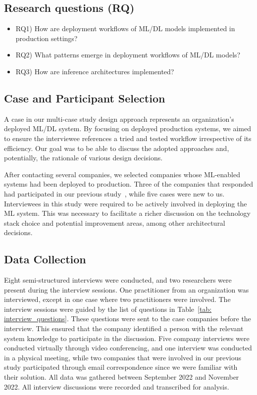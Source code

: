 \subsection{Research questions (RQ)}
\begin{itemize}
    \item RQ1) How are deployment workflows of ML/DL models implemented in production settings?
    \item RQ2) What patterns emerge in deployment workflows of ML/DL models?
    \item RQ3) How are inference architectures implemented?
\end{itemize}

\subsection{Case and Participant Selection}
A case in our multi-case study design approach represents an organization's deployed ML/DL system. By focusing on deployed production systems, we aimed to ensure the interviewee references a tried and tested workflow irrespective of its efficiency. Our goal was to be able to discuss the adopted approaches and, potentially, the rationale of various design decisions.

After contacting several companies, we selected companies whose ML-enabled systems had been deployed to production. Three of the companies that responded had participated in our previous study~\cite{muiruri2022practices}, while five cases were new to us. Interviewees in this study were required to be actively involved in deploying the ML system. This was necessary to facilitate a richer discussion on the technology stack choice and potential improvement areas, among other architectural decisions.


\subsection{Data Collection}
Eight semi-structured interviews were conducted, and two researchers were present during the interview sessions. One practitioner from an organization was interviewed, except in one case where two practitioners were involved. The interview sessions were guided by the list of questions in Table~\ref{tab: interview_questions}. These questions were sent to the case companies before the interview. This ensured that the company identified a person with the relevant system knowledge to participate in the discussion. Five company interviews were conducted virtually through video conferencing, and one interview was conducted in a physical meeting, while two companies that were involved in our previous study participated through email correspondence since we were familiar with their solution. All data was gathered between September 2022 and November 2022. All interview discussions were recorded and transcribed for analysis.

